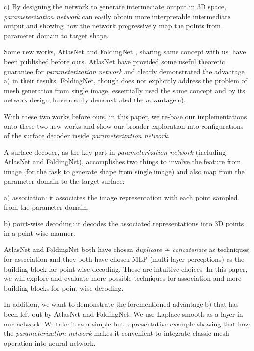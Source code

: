 c) By designing the network to generate intermediate output in 3D space, \emph{parameterization network} can easily obtain more interpretable intermediate output and showing how the network progressively map the points from parameter domain to target shape.   

Some new works, AtlasNet\cite{atlasnet} and FoldingNet\cite{foldingnet} , sharing same concept with us, have been published before ours. AtlasNet\cite{atlasnet} have provided some useful theoretic guarantee for \emph{parameterization network} and clearly demonstrated the advantage a) in their results. FoldingNet\cite{foldingnet}, though does not explicitly address the problem of mesh generation from single image, essentially used the same concept and by its network design, have clearly demonstrated the advantage c). 

With these two works before ours, in this paper, we re-base our implementations onto these two new works and show our broader exploration into configurations of the surface decoder inside \emph{parameterization network}.

A surface decoder, as the key part in \emph{parameterization network} (including AtlasNet\cite{atlasnet} and FoldingNet\cite{foldingnet}), accomplishes two things to involve the feature from image (for the task to generate shape from single image) and also map from the parameter domain to the target surface:
 
a) association: it associates the image representation with each point sampled from the parameter domain. 
 
b) point-wise decoding: it decodes the associated representations into 3D points in a point-wise manner.
 
 AtlasNet\cite{atlasnet} and FoldingNet\cite{foldingnet} both have chosen \emph{duplicate + concatenate} as techniques for association and they both have chosen MLP (multi-layer perceptions) as the building block for point-wise decoding.
These are intuitive choices. In this paper, we will explore and evaluate more possible techniques for association and more building blocks for point-wise decoding.

In addition, we want to demonstrate the forementioned advantage b) that has been left out by AtlasNet\cite{atlasnet} and FoldingNet\cite{foldingnet}. We use Laplace smooth as a layer in our network. We take it as a simple but representative example showing that how the \emph{parameterization network} makes it convenient to integrate classic mesh operation into neural network. 



 